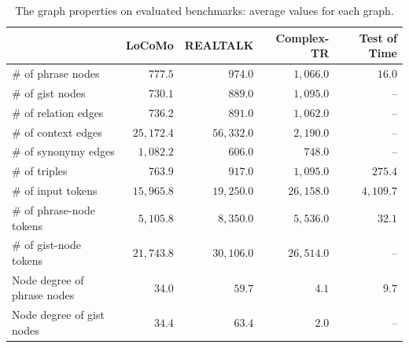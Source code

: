 \documentclass{article} %
\begin{document}
\begin{table}[htb]
\centering
\small
\caption{The graph properties on evaluated benchmarks: average values for each graph.}
\begin{tabular}{lrrrr}
\toprule
 & LoCoMo & REALTALK & Complex-TR & Test of Time \\
\midrule
\# of phrase nodes                   & $777.5$     & $974.0$     & $1,066.0$   & $16.0$     \\
\# of gist nodes                     & $730.1$     & $889.0$     & $1,095.0$   & --         \\
\# of relation edges                 & $736.2$     & $891.0$     & $1,062.0$   & --         \\
\# of context edges                  & $25,172.4$  & $56,332.0$  & $2,190.0$   & --         \\
\# of synonymy edges                 & $1,082.2$   & $606.0$     & $748.0$     & --         \\
\# of triples                        & $763.9$     & $917.0$     & $1,095.0$   & $275.4$    \\
\midrule
\# of input tokens                   & $15,965.8$  & $19,250.0$  & $26,158.0$  & $4,109.7$  \\
\# of phrase-node tokens & $5,105.8$   & $8,350.0$   & $5,536.0$   & $32.1$     \\
\# of gist-node tokens   & $21,743.8$  & $30,106.0$  & $26,514.0$  & --         \\
\midrule
Node degree of phrase nodes          & $34.0$      & $59.7$      & $4.1$       & $9.7$      \\
Node degree of gist nodes            & $34.4$      & $63.4$      & $2.0$       & --         \\
\bottomrule
\end{tabular}
\label{tab:graph_properties}
\end{table}
\end{document}
